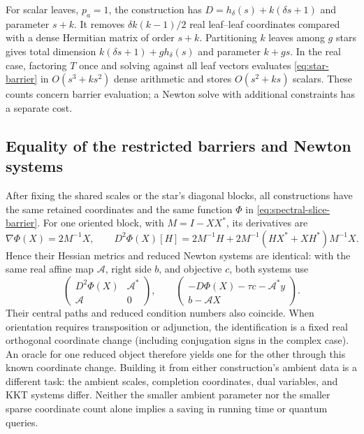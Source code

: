 For scalar leaves, $p_a=1$, the construction has
$D=h_\delta(s)+k(\delta s+1)$ and parameter $s+k$.
It removes $\delta k(k-1)/2$ real leaf--leaf coordinates compared with a
dense Hermitian matrix of order $s+k$.  Partitioning $k$ leaves among
$g$ stars gives total dimension $k(\delta s+1)+g h_\delta(s)$ and
parameter $k+gs$.
In the real case, factoring $T$ once and solving against all leaf vectors
evaluates \eqref{eq:star-barrier} in $O(s^3+ks^2)$ dense arithmetic
and stores $O(s^2+ks)$ scalars.  These counts concern barrier evaluation;
a Newton solve with additional constraints has a separate cost.

\subsection{Equality of the restricted barriers and Newton systems}

After fixing the shared scales or the star's diagonal blocks, all
constructions have the same retained coordinates and the same function
$\Phi$ in \eqref{eq:spectral-slice-barrier}.  For one oriented block,
with $M=I-XX^*$, its derivatives are
\[
 \nabla\Phi(X)=2M^{-1}X,\qquad
 D^2\Phi(X)[H]=2M^{-1}H+
       2M^{-1}(HX^*+XH^*)M^{-1}X.
\]
Hence their Hessian metrics and reduced Newton systems are identical:
with the same real affine map $\mathcal A$, right side $b$,
and objective $c$, both systems use
\[
 \begin{pmatrix}D^2\Phi(X)&\mathcal A^*\\\mathcal A&0\end{pmatrix},
 \qquad
 \begin{pmatrix}-D\Phi(X)-\tau c-\mathcal A^*y\\b-\mathcal A X\end{pmatrix}.
\]
Their central paths and reduced condition numbers also coincide.
When orientation requires transposition or adjunction, the identification
is a fixed real orthogonal coordinate change (including conjugation signs
in the complex case).  An oracle for one reduced object therefore yields one for the other
through this known coordinate change.  Building it from either
construction's ambient data is a different task: the ambient
scales, completion coordinates, dual variables, and KKT systems differ.
Neither the smaller ambient parameter nor the smaller sparse coordinate
count alone implies a saving in running time or quantum queries.
